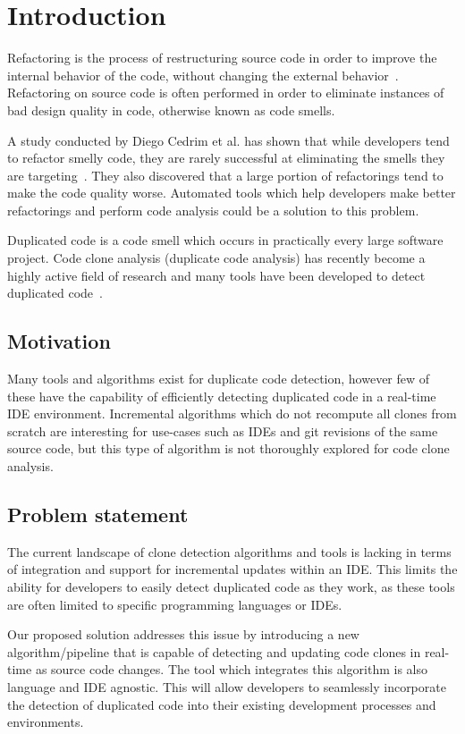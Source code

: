 \chapter{Introduction}

Refactoring is the process of restructuring source code in order to improve the internal behavior
of the code, without changing the external behavior~\cite[9]{fowlerrefactoring}.
Refactoring on source code is often performed in order to eliminate instances of bad
design quality in code, otherwise known as code smells.

A study conducted by Diego Cedrim et al. has shown that while developers tend to refactor
smelly code, they are rarely successful at eliminating the smells they are
targeting~\cite{Rohit_Gheyi_Impact}. They also discovered that a large portion of
refactorings tend to make the code quality worse. Automated tools which help developers
make better refactorings and perform code analysis could be a solution to this problem.

Duplicated code is a code smell which occurs in practically every large software project.
Code clone analysis (duplicate code analysis) has recently become a highly active field
of research and many tools have been developed to detect duplicated
code~\cite[7]{Inoue_introduction_to_cc}. 

\section{Motivation}

Many tools and algorithms exist for duplicate code detection, however few of these have
the capability of efficiently detecting duplicated code in a real-time IDE environment.
Incremental algorithms which do not recompute all clones from scratch are interesting for
use-cases such as IDEs and git revisions of the same source code, but this type of
algorithm is not thoroughly explored for code clone analysis.

\section{Problem statement}

The current landscape of clone detection algorithms and tools is lacking in terms of
integration and support for incremental updates within an IDE. This limits the ability for
developers to easily detect duplicated code as they work, as these tools are often limited
to specific programming languages or IDEs.

Our proposed solution addresses this issue by introducing a new algorithm/pipeline that is
capable of detecting and updating code clones in real-time as source code changes. The
tool which integrates this algorithm is also language and IDE agnostic. This will allow
developers to seamlessly incorporate the detection of duplicated code into their existing
development processes and environments.
